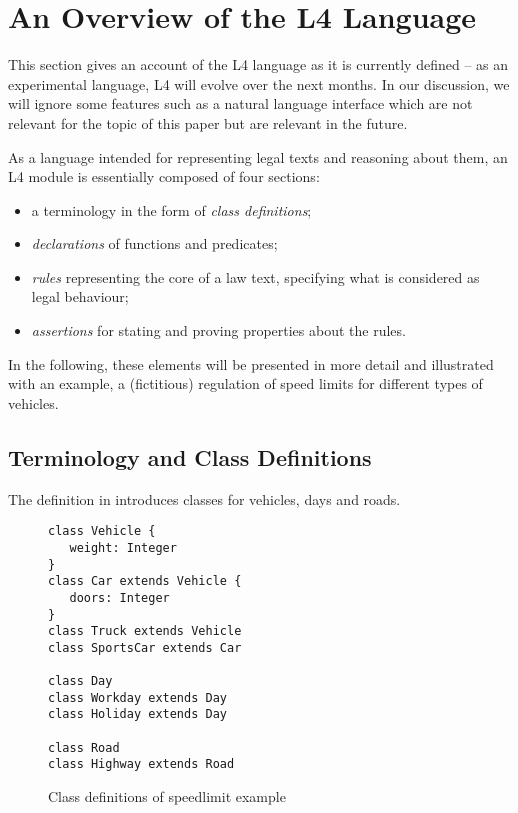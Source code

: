 \section{An Overview of the L4 Language}\label{sec:l4_language}

This section gives an account of the L4 language as it is currently defined --
as an experimental language, L4 will evolve over the next months. In our
discussion, we will ignore some features such as a natural language interface
\cite{listemnmaa2021cnl} which are not relevant for the topic of this paper but are relevant in the future.

As a language intended for representing legal texts and reasoning about them,
an L4 module is essentially composed of four sections:
\begin{itemize}
\item a terminology in the form of \emph{class definitions};
\item \emph{declarations} of functions and predicates;
\item \emph{rules} representing the core of a law text, specifying what is
  considered as legal behaviour;
\item \emph{assertions} for stating and proving properties about the rules.
\end{itemize}

In the following, these elements will be presented in more detail and
illustrated with an example, a (fictitious) regulation of speed
limits for different types of vehicles.


\subsection{Terminology and Class Definitions}\label{sec:classdefs}

The definition in  introduces classes for vehicles, days
and roads. 

\begin{figure}[h!]
\begin{lstlisting}
class Vehicle {
   weight: Integer
}
class Car extends Vehicle {
   doors: Integer
}
class Truck extends Vehicle
class SportsCar extends Car

class Day
class Workday extends Day
class Holiday extends Day

class Road
class Highway extends Road
\end{lstlisting}
  \caption{Class definitions of speedlimit example}\label{fig:classdefs}
\end{figure}

